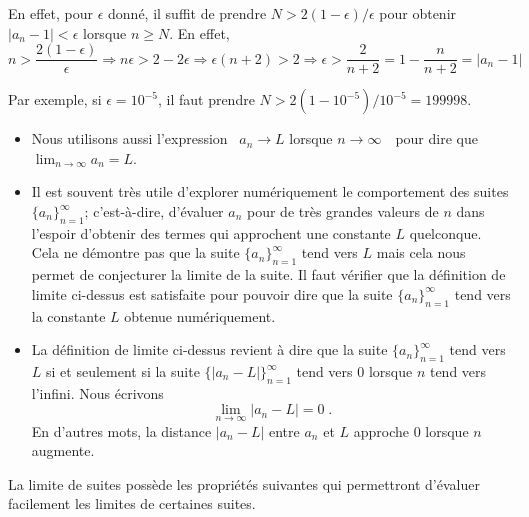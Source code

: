 {\begin{egg}[\theory]
En effet, pour $\epsilon$ donné, il suffit de prendre
$N > 2(1-\epsilon)/\epsilon$ pour obtenir
$|a_n-1| < \epsilon$ lorsque $n\geq N$.  En effet,
\[
n > \frac{2(1-\epsilon)}{\epsilon} \Rightarrow
n\epsilon > 2 - 2\epsilon \Rightarrow \epsilon(n+2) > 2
\Rightarrow \epsilon > \frac{2}{n+2} = 1 - \frac{n}{n+2}  
= | a_n - 1|
\]

Par exemple, si $\epsilon = 10^{-5}$, il faut prendre
$N > 2(1-10^{-5})/10^{-5} = 199998$.
\end{egg}

\begin{rmkList}
\begin{itemize}
\item Nous utilisons aussi l'expression \flqq\ $a_n \rightarrow L$ lorsque
  $n\rightarrow \infty$\ \frqq\ pour dire que
  $\displaystyle \lim_{n\rightarrow \infty} a_n = L$. 
\item Il est souvent très utile d'explorer numériquement le
  comportement des suites $\{ a_n\}_{n=1}^\infty$; c'est-à-dire,
  d'évaluer $a_n$ pour de très grandes valeurs de $n$ dans l'espoir
  d'obtenir des termes qui approchent une constante $L$ quelconque.
  Cela ne démontre pas que la suite $\{ a_n\}_{n=1}^\infty$ tend vers
  $L$ mais cela nous permet de conjecturer la limite de la suite.  Il
  faut vérifier que la définition de limite ci-dessus est satisfaite
  pour pouvoir dire que la suite $\{ a_n\}_{n=1}^\infty$ tend vers la
  constante $L$ obtenue numériquement.
\item La définition de limite ci-dessus revient à dire que la suite
  $\{ a_n\}_{n=1}^\infty$ tend vers $L$ si et seulement si la suite
  $\{ |a_n - L|\}_{n=1}^\infty$ tend vers $0$ lorsque $n$ tend vers
  l'infini.  Nous écrivons
  \[
    \lim_{n\rightarrow \infty} |a_n-L| = 0 \; .
  \]
  En d'autres mots, la distance $|a_n - L|$ entre $a_n$ et $L$ approche
  $0$ lorsque $n$ augmente. 
\end{itemize}
\end{rmkList}

La limite de suites possède les propriétés suivantes qui
permettront d'évaluer facilement les limites de certaines suites.

}
